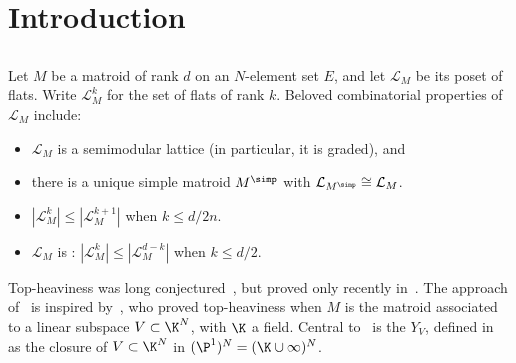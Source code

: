 \theoremstyle{definition}
\newtheorem{thmdfn}{Theorem/Definition}[section]

\theoremstyle{remark}
\newtheorem{zbbackend}{Example}[section]
\newenvironment{zb}[1][]{\begin{zbbackend}[#1]}{\hspace*{\fill}$\diamondsuit$\end{zbbackend}}

\newenvironment{claim}{\par\medskip\noindent\textit{Claim.}\space}{}

\section{Introduction}
\subsection{} Let $M$ be a matroid of rank $d$ on an $N$-element set $E$, and let $\mathcal L_M$ be its poset of flats. Write $\mathcal L_M^k$ for the set of flats of rank $k$.
Beloved combinatorial properties of~$\mathcal L_M$ include:
\begin{itemize}
\item $\mathcal L_M$ is a semimodular lattice (in particular, it is graded), and
\item there is a unique simple matroid $M^\simp$ with $\mathcal L_{M^\simp} \cong \mathcal L_M$.
\item $|\mathcal L_M^k| \leq |\mathcal L_M^{k+1}|$ when $k \leq d/2n$.
\item $\mathcal L_M$ is : $|\mathcal L_M^k| \leq |\mathcal L_M^{d-k}|$ when $k \leq d/2$.
\end{itemize}
Top-heaviness was long conjectured~\cite{DW74, DW75}, but proved only recently in~\cite{BHMPW20b}.
The approach of~\cite{BHMPW20b} is inspired by~\cite{HW17}, who proved top-heaviness when $M$ is the matroid associated to a linear subspace $V \subset \K^N$, with $\K$ a field.
Central to~\cite{HW17} is the  $Y_V$, defined in~\cite{AB16} as the closure of $V \subset \K^N$ in $(\P^1)^N = (\K \cup \infty)^N$.


